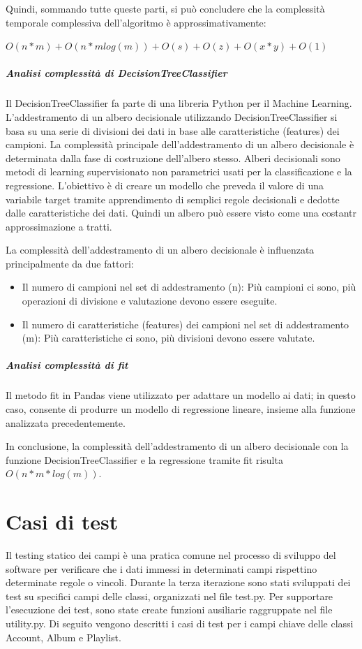 Quindi, sommando tutte queste parti, si può concludere che la complessità temporale complessiva dell'algoritmo 
è approssimativamente:

\boldmath
\begin{center}
    $O(n * m) + O(n * m log(m)) + O(s) + O(z) + O(x * y) + O(1)$
\end{center}
\unboldmath


\subparagraph{Analisi complessità di \textit{DecisionTreeClassifier}}
Il DecisionTreeClassifier fa parte di una libreria Python per il Machine Learning.
L'addestramento di un albero decisionale utilizzando DecisionTreeClassifier si basa 
su una serie di divisioni dei dati in base alle caratteristiche (features) dei campioni.
La complessità principale dell'addestramento di un albero decisionale è determinata 
dalla fase di costruzione dell'albero stesso.
Alberi decisionali sono metodi di learning supervisionato non parametrici usati per la classificazione
e la regressione. L'obiettivo è di creare un modello che preveda il valore di una variabile target tramite 
apprendimento di semplici regole decisionali e dedotte dalle caratteristiche dei dati. Quindi 
un albero può essere visto come una costantr approssimazione a tratti.


La complessità dell'addestramento di un albero decisionale è influenzata 
principalmente da due fattori:
\begin{itemize}
    \item Il numero di campioni nel set di addestramento (n): Più campioni ci sono, 
        più operazioni di divisione e valutazione devono essere eseguite.
    \item Il numero di caratteristiche (features) dei campioni nel set di addestramento (m): 
        Più caratteristiche ci sono, più divisioni devono essere valutate.
\end{itemize}

\vspace{0.3cm}
\subparagraph{Analisi complessità di \textit{fit}}
Il metodo fit in Pandas viene utilizzato per adattare un modello ai dati; in questo caso,
consente di produrre un modello di regressione lineare, insieme alla funzione analizzata
precedentemente. 
\vspace{0.5cm}


In conclusione, la complessità dell'addestramento di un albero decisionale 
con la funzione DecisionTreeClassifier e la regressione tramite fit 
risulta $O(n * m * log(m))$.

\newpage
\section{Casi di test}
Il testing statico dei campi è una pratica comune nel processo di sviluppo del software 
per verificare che i dati immessi in determinati campi rispettino determinate regole o vincoli. 
Durante la terza iterazione sono stati sviluppati dei test su specifici campi delle classi, organizzati nel file test.py. Per supportare l'esecuzione 
dei test, sono state create funzioni ausiliarie raggruppate nel file utility.py.
Di seguito vengono descritti i casi di test per i campi chiave delle classi Account, Album e Playlist.


